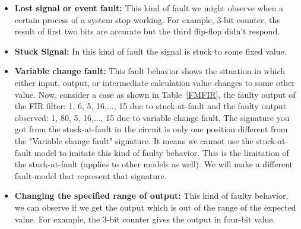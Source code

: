 \begin{itemize}

\item \textbf{Lost signal or event fault:} This kind of fault we might observe when a certain process of a system stop working. For example, 3-bit counter, the result of first two bits are accurate but the third flip-flop didn't respond.

\item \textbf{Stuck Signal:} In this kind of fault the signal is stuck to some fixed value. 

\item \textbf{Variable change fault:} This fault behavior shows the situation in which either input, output, or intermediate calculation value changes to some other value. Now, consider a case as shown in Table~\ref{FMFIR}, the faulty output of the FIR filter: {1, 6, 5, 16,..., 15} due to stuck-at-fault and the faulty output  observed: {1, 80, 5, 16,..., 15} due to variable change fault. The signature you got from the stuck-at-fault in the circuit is only one position different from the "Variable change fault" signature.  It means we cannot use the stuck-at-fault model to imitate this kind of faulty behavior. This is  the limitation of the stuck-at-fault (applies to other models as well). We will make a different fault-model that represent that signature.


\begin{table}[tb!]
\center
\caption{Fault Models FIR}

\label{FMFIR}
\end{table}

\item \textbf{Changing the specified range of output:} This kind of faulty behavior, we can observe if we get the output which is out of the range of the expected value. For example, the 3-bit counter gives the output in four-bit value.


\end{itemize}
